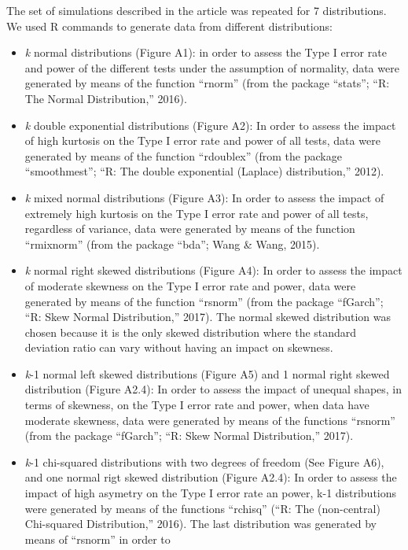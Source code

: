 \documentclass[man,floatsintext]{apa6}
\begin{document}
\begin{appendix}
The set of simulations described in the article was repeated for 7
distributions. We used R commands to generate data from different
distributions:

\begin{itemize}
\item
\emph{k} normal distributions (Figure A1): in order to assess the Type
I error rate and power of the different tests under the assumption of
normality, data were generated by means of the function ``rnorm''
(from the package ``stats''; ``R: The Normal Distribution,'' 2016).
\item
\emph{k} double exponential distributions (Figure A2): In order to
assess the impact of high kurtosis on the Type I error rate and power
of all tests, data were generated by means of the function
``rdoublex'' (from the package ``smoothmest''; ``R: The double
exponential (Laplace) distribution,'' 2012).
\item
\emph{k} mixed normal distributions (Figure A3): In order to assess
the impact of extremely high kurtosis on the Type I error rate and
power of all tests, regardless of variance, data were generated by
means of the function ``rmixnorm'' (from the package ``bda''; Wang \&
Wang, 2015).
\item
\emph{k} normal right skewed distributions (Figure A4): In order to
assess the impact of moderate skewness on the Type I error rate and
power, data were generated by means of the function ``rsnorm'' (from
the package ``fGarch''; ``R: Skew Normal Distribution,'' 2017). The
normal skewed distribution was chosen because it is the only skewed
distribution where the standard deviation ratio can vary without
having an impact on skewness.
\item
\emph{k}-1 normal left skewed distributions (Figure A5) and 1 normal
right skewed distribution (Figure A2.4): In order to assess the impact
of unequal shapes, in terms of skewness, on the Type I error rate and
power, when data have moderate skewness, data were generated by means
of the functions ``rsnorm'' (from the package ``fGarch''; ``R: Skew
Normal Distribution,'' 2017).
\item
\emph{k}-1 chi-squared distributions with two degrees of freedom (See
Figure A6), and one normal rigt skewed distribution (Figure A2.4): In
order to assess the impact of high asymetry on the Type I error rate
an power, k-1 distributions were generated by means of the functions
``rchisq'' (``R: The (non-central) Chi-squared Distribution,'' 2016).
The last distribution was generated by means of ``rsnorm'' in order to

\end{itemize}
\end{appendix}
\end{document}
